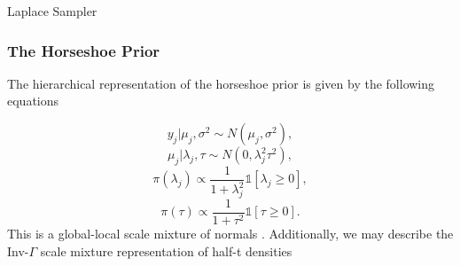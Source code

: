			\begin{algorithm}[H]
{}
\caption{Laplace Sampler}\label{psd:laplace_sampler}
			\end{algorithm}
		
		\subsubsection{The Horseshoe Prior}\label{sec:horseshoe_app}
The hierarchical representation of the horseshoe prior \cite{carvalho2010horseshoe} is given by the following equations

 \begin{equation}\label{eqn:horseshoe1}
 y_j\vert\mu_j, \sigma^2 \sim N(\mu_j, \sigma^2),
 \end{equation}  
 \begin{equation}\label{eqn:horseshoe2}
 \mu_j\vert\lambda_j,\tau \sim N(0, \lambda_j^2 \tau^2 ),
 \end{equation}  
  \begin{equation}\label{eqn:horseshoe3}
  \pi(\lambda_j)\propto \frac{1}{1+\lambda_j^2}\mathds{1}[\lambda_j\geq 0],
 \end{equation} 
   \begin{equation}\label{eqn:horseshoe4}
  \pi(\tau)\propto \frac{1}{1+\tau^2}\mathds{1}[\tau\geq 0].
 \end{equation} 
 This is a global-local scale mixture of normals \cite{polson2010shrink}. Additionally, we may describe the Inv-$\Gamma$ scale mixture representation of half-t densities \cite{gelman2006prior} 

